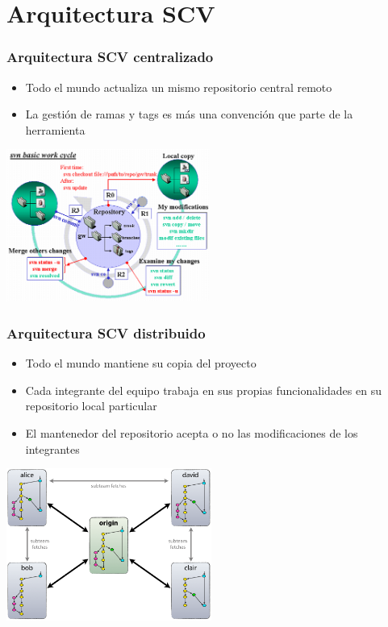 \section{Arquitectura SCV}
\frame
{
\frametitle{Arquitectura SCV centralizado}
\begin{itemize}
 \item Todo el mundo actualiza un mismo repositorio central remoto
 \item La gestión de ramas y tags es más una convención que parte de la herramienta
\end{itemize}

\begin{center}
 \includegraphics[height=5cm]{imgs/svnscheme.png}
\end{center}
}

\frame
{
\frametitle{Arquitectura SCV distribuido}
\begin{itemize}
 \item Todo el mundo mantiene su copia del proyecto
 \item Cada integrante del equipo trabaja en sus propias funcionalidades en su repositorio local particular
 \item El mantenedor del repositorio acepta o no las modificaciones de los integrantes
\end{itemize}

\begin{center}
 \includegraphics[height=5cm]{imgs/gitscheme.png}
\end{center}
}


